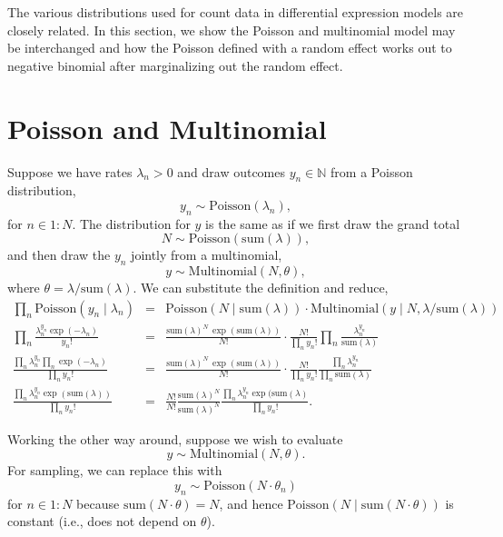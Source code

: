 \documentclass[11pt]{report}
\newcommand{\rngto}[1]{1{:}#1}
\begin{document}
The various distributions used for count data in differential
expression models are closely related. In this section, we show the
Poisson and multinomial model may be interchanged and how the Poisson
defined with a random effect works out to negative binomial after
marginalizing out the random effect.

\section{Poisson and Multinomial}

Suppose we have rates $\lambda_n > 0$ and draw outcomes $y_n \in
\mathbb{N}$ from a Poisson distribution,%
%
\[
  y_n \sim \textrm{Poisson}(\lambda_n),
\]
%
for $n \in \rngto{N}$. The distribution for $y$ is the same as if we
first draw the grand total
%
\[
  N \sim \textrm{Poisson}(\textrm{sum}(\lambda)),
\]
%
and then draw the $y_n$ jointly from a multinomial,%
%
\[
  y \sim \textrm{Multinomial}(N, \theta),
\]
%
where $\theta = \lambda / \textrm{sum}(\lambda)$.  We can substitute
the definition and reduce,
%
{\small
\begin{eqnarray*}
    \prod_n \textrm{Poisson}(y_n \mid \lambda_n)
    & = & \textrm{Poisson}(N \mid \textrm{sum}(\lambda))
          \cdot \textrm{Multinomial}(y \mid N, \lambda / \textrm{sum}(\lambda))
    \\[3pt]
    \prod_n \frac{\lambda_n^{y_n} \exp(-\lambda_n)}{y_n!}
    & = &
          \frac{\textrm{sum}(\lambda)^N \, \exp(\textrm{sum}(\lambda))}{N!}
          \cdot
          \frac{N!}{\prod_n y_n!}
          \prod_n \frac{\lambda_n^{y_n}}{\textrm{sum}(\lambda)}
    \\[3pt]
    \frac{\prod_n \lambda_n^{y_n} \prod_n \exp(-\lambda_n)}{\prod_n y_n!}
    & = &
          \frac{\textrm{sum}(\lambda)^N \, \exp(\textrm{sum}(\lambda))}{N!}
          \cdot
          \frac{N!}{\prod_n y_n!}
          \frac{\prod_n \lambda_n^{y_n}}{\prod_n \textrm{sum}(\lambda)}
    \\[3pt]
    \frac{\prod_n \lambda_n^{y_n} \exp(\textrm{sum}(\lambda))}{\prod_n y_n!}
    & = &
          \frac{N!}{N!}
          \frac{\textrm{sum}(\lambda)^N}{\textrm{sum}(\lambda)^N}
          \frac{\prod_n \lambda_n^{y_n} \exp(\textrm{sum}(\lambda)}{\prod_n y_n!}.
\end{eqnarray*}
}

Working the other way around, suppose we wish to evaluate
\[
  y \sim \textrm{Multinomial}(N, \theta).
\]
For sampling, we can replace this with
\[
  y_n \sim \textrm{Poisson}(N \cdot \theta_n)
\]
for $n \in \rngto{N}$ because $\textrm{sum}(N \cdot \theta) = N$, and
hence $\textrm{Poisson}(N \mid \textrm{sum}(N \cdot \theta))$ is
constant (i.e., does not depend on $\theta$).
\end{document}
